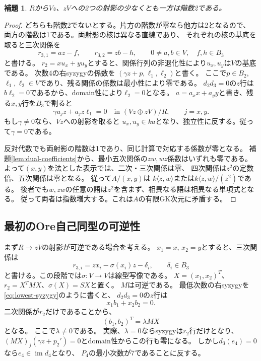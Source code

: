 \documentclass[11pt,a4paper]{ltjsarticle}
\newtheorem{lemma}[theorem]{補題}
\theoremstyle{definition}
\begin{document}
\begin{lemma}\label{lem:cubic-projection}
$R$から$Vz$、$zV$への2つの射影の少なくとも一方は階数2である。
\end{lemma}
\begin{proof}
どちらも階数2でないとする。片方の階数が零なら他方は2となるので、
両方の階数は1である。両射影の核は異なる直線であり、
それぞれの核の基底を取ると三次関係を
\[
r_{3,1}=az-f,\qquad r_{3,2}=zb-h,\qquad
0\ne a,b\in V,\quad f,h\in B_3
\]
と書ける。
$r_2=xu_x+yu_y$とすると、関係行列の非退化性により$u_x,u_y$は$V$の基底である。
次数4の右syzygyの係数を
$(\gamma z+p,\ell_1,\ell_2)$と書く。
ここで$p\in B_2$, $\ell_1,\ell_2\in V$であり、残る関係の係数は最小性により零である。
$d_2d_3=0$の$z$行は$b\ell_2=0$であるから、domain性により$\ell_2=0$となる。
$a=a_xx+a_yy$と書き、残る$x,y$行を$B_3$で割ると
\[
\gamma u_jz+a_jz\ell_1=0
\quad\text{in }(Vz\oplus zV)/R,\qquad j=x,y.
\]
もし$\gamma\ne0$なら、$Vz$への射影を取ると
$u_x,u_y\in ka$となり、独立性に反する。従って$\gamma=0$である。

反対代数でも両射影の階数は1であり、同じ計算で対応する係数が零となる。
補題\ref{lem:dual-coefficients}から、最小五次関係の$zw,wz$係数はいずれも零である。
よって$(x,y)$を法とした表示では、二次・三次関係は零、
四次関係は$z^2$の定数倍、五次関係は零となる。
従って$A/(x,y)$は
$k\langle z,w\rangle$または$k\langle z,w\rangle/(z^2)$である。
後者でも$w,zw$の任意の語は$z^2$を含まず、相異なる語は相異なる単項式となる。
従って両者は指数増大する。これは$A$の有限GK次元に矛盾する。
\end{proof}

\subsection{最初のOre自己同型の可逆性}
まず$R\to zV$の射影が可逆である場合を考える。
$x_1=x$, $x_2=y$とすると、三次関係は
\begin{equation}\label{eq:cubic-graph}
r_{3,i}=zx_i-\sigma(x_i)z-\delta_i,\qquad \delta_i\in B_3
\end{equation}
と書ける。この段階では$\sigma:V\to V$は線型写像である。
$X=(x_1,x_2)^T$、
$r_2=X^TMX$、$\sigma(X)=SX$と置く。
$M$は可逆である。
最低次数の右syzygyを\eqref{eq:lowest-syzygy}のように書くと、
$d_2d_3=0$の$z$行は
\[
x_1b_1+x_2b_2=0.
\]
二次関係が$r_2$だけであることから、
\begin{equation}\label{eq:b-vector}
(b_1,b_2)^T=\lambda MX
\end{equation}
となる。
ここで$\lambda\ne0$である。
実際、$\lambda=0$ならsyzygyは$r_2$行だけとなり、
$(MX)_j(\gamma z+p_2')=0$とdomain性からこの行も零になる。
しかし$d_3(e_4)=0$なら$e_4\in\operatorname{im}d_4$となり、
$P_4$の最小次数が7であることに反する。
\end{document}
